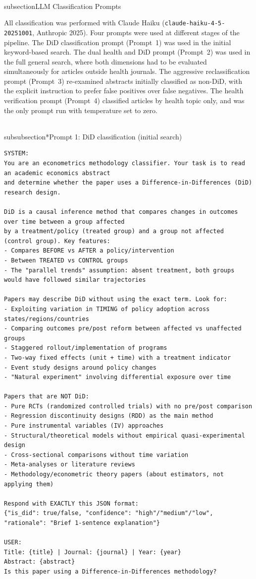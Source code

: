 \\subsection{LLM Classification Prompts}

All classification was performed with Claude Haiku (\texttt{claude-haiku-4-5-20251001}, Anthropic 2025). Four prompts were used at different stages of the pipeline. The DiD classification prompt (Prompt~1) was used in the initial keyword-based search. The dual health and DiD prompt (Prompt~2) was used in the full general search, where both dimensions had to be evaluated simultaneously for articles outside health journals. The aggressive reclassification prompt (Prompt~3) re-examined abstracts initially classified as non-DiD, with the explicit instruction to prefer false positives over false negatives. The health verification prompt (Prompt~4) classified articles by health topic only, and was the only prompt run with temperature set to zero.

\\subsubsection*{Prompt 1: DiD classification (initial search)}

\begin{tcolorbox}[colback=gray!5, colframe=gray!60, breakable]
\tiny
\begin{verbatim}
SYSTEM:
You are an econometrics methodology classifier. Your task is to read an academic economics abstract
and determine whether the paper uses a Difference-in-Differences (DiD) research design.

DiD is a causal inference method that compares changes in outcomes over time between a group affected
by a treatment/policy (treated group) and a group not affected (control group). Key features:
- Compares BEFORE vs AFTER a policy/intervention
- Between TREATED vs CONTROL groups
- The "parallel trends" assumption: absent treatment, both groups would have followed similar trajectories

Papers may describe DiD without using the exact term. Look for:
- Exploiting variation in TIMING of policy adoption across states/regions/countries
- Comparing outcomes pre/post reform between affected vs unaffected groups
- Staggered rollout/implementation of programs
- Two-way fixed effects (unit + time) with a treatment indicator
- Event study designs around policy changes
- "Natural experiment" involving differential exposure over time

Papers that are NOT DiD:
- Pure RCTs (randomized controlled trials) with no pre/post comparison
- Regression discontinuity designs (RDD) as the main method
- Pure instrumental variables (IV) approaches
- Structural/theoretical models without empirical quasi-experimental design
- Cross-sectional comparisons without time variation
- Meta-analyses or literature reviews
- Methodology/econometric theory papers (about estimators, not applying them)

Respond with EXACTLY this JSON format:
{"is_did": true/false, "confidence": "high"/"medium"/"low", "rationale": "Brief 1-sentence explanation"}

USER:
Title: {title} | Journal: {journal} | Year: {year}
Abstract: {abstract}
Is this paper using a Difference-in-Differences methodology?
\end{verbatim}
\end{tcolorbox}



